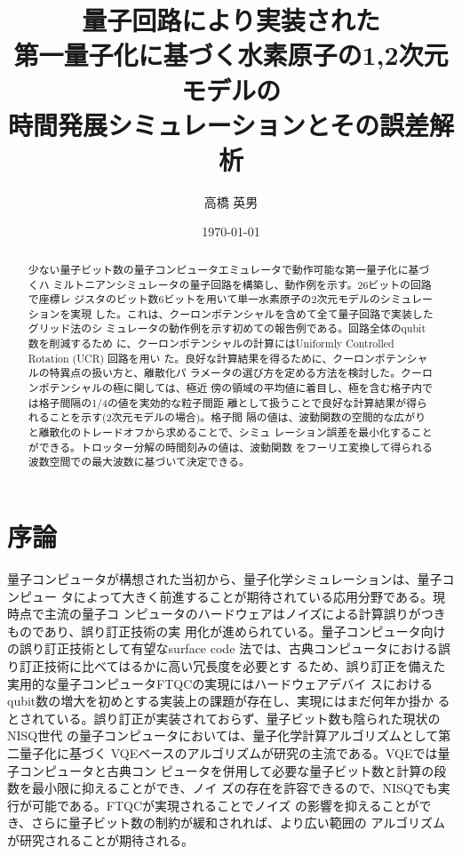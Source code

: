 \documentclass[fontsize=11pt]{jlreq}
\begin{document}
\title
{量子回路により実装された\\
第一量子化に基づく水素原子の1,2次元モデルの\\
時間発展シミュレーションとその誤差解析}
\author{高橋 英男}
\date{\today}
\maketitle
\begin{abstract}
少ない量子ビット数の量子コンピュータエミュレータで動作可能な第一量子化に基づくハ
ミルトニアンシミュレータの量子回路を構築し、動作例を示す。26ビットの回路で座標レ
ジスタのビット数6ビットを用いて単一水素原子の2次元モデルのシミュレーションを実現
した。これは、クーロンポテンシャルを含めて全て量子回路で実装したグリッド法のシ
ミュレータの動作例を示す初めての報告例である。回路全体のqubit数を削減するため
に、クーロンポテンシャルの計算にはUniformly Controlled Rotation (UCR) 回路を用い
た。良好な計算結果を得るために、クーロンポテンシャルの特異点の扱い方と、離散化パ
ラメータの選び方を定める方法を検討した。クーロンポテンシャルの極に関しては、極近
傍の領域の平均値に着目し、極を含む格子内では格子間隔の1/4の値を実効的な粒子間距
離として扱うことで良好な計算結果が得られることを示す(2次元モデルの場合)。格子間
隔の値は、波動関数の空間的な広がりと離散化のトレードオフから求めることで、シミュ
レーション誤差を最小化することができる。トロッター分解の時間刻みの値は、波動関数
をフーリエ変換して得られる波数空間での最大波数に基づいて決定できる。

\end{abstract}

\section{序論}
量子コンピュータが構想された当初から、量子化学シミュレーションは、量子コンピュー
タによって大きく前進することが期待されている応用分野である。現時点で主流の量子コ
ンピュータのハードウェアはノイズによる計算誤りがつきものであり、誤り訂正技術の実
用化が進められている。量子コンピュータ向けの誤り訂正技術として有望なsurface code
法では、古典コンピュータにおける誤り訂正技術に比べてはるかに高い冗長度を必要とす
るため、誤り訂正を備えた実用的な量子コンピュータFTQCの実現にはハードウェアデバイ
スにおけるqubit数の増大を初めとする実装上の課題が存在し、実現にはまだ何年か掛か
るとされている。誤り訂正が実装されておらず、量子ビット数も陰られた現状のNISQ世代
の量子コンピュータにおいては、量子化学計算アルゴリズムとして第二量子化に基づく
VQEベースのアルゴリズムが研究の主流である。VQEでは量子コンピュータと古典コン
ピュータを併用して必要な量子ビット数と計算の段数を最小限に抑えることができ、ノイ
ズの存在を許容できるので、NISQでも実行が可能である。FTQCが実現されることでノイズ
の影響を抑えることができ、さらに量子ビット数の制約が緩和されれば、より広い範囲の
アルゴリズムが研究されることが期待される。
\end{document}
